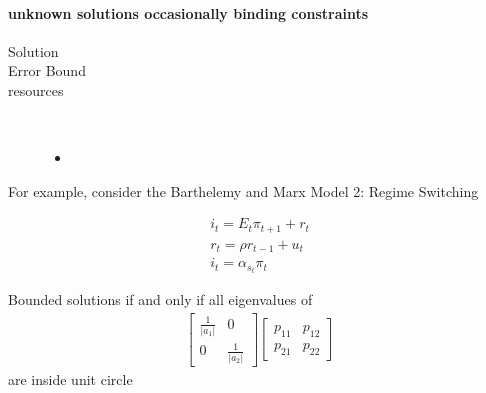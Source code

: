 \documentclass[12pt]{article}
\begin{document}
\paragraph{unknown solutions occasionally binding constraints}
\begin{description}
\item[Solution]
\item[Error Bound]
\item[resources]\
  \begin{itemize}
  \item 
  \end{itemize}
\end{description}



For example,
consider  the Barthelemy and Marx  Model 2: Regime Switching\cite{marxbarthelemy2012}


\cite{troy2007}
\begin{gather}
  \label{eq:4}
  i_t =E_t \pi_{t+1} + r_t\\
r_t= \rho r_{t-1} +u_t\\
i_t=\alpha_{s_t} \pi_t
\end{gather}

Bounded solutions if and only if all eigenvalues of 
\begin{gather}
  \label{eq:5}
  \begin{bmatrix}
    \frac{1}{|a_1|}&0\\
0&    \frac{1}{|a_2|}
  \end{bmatrix}
  \begin{bmatrix}
    p_{11}&p_{12}\\p_{21}&p_{22}
  \end{bmatrix}
\end{gather}
 are inside unit circle
\end{document}
